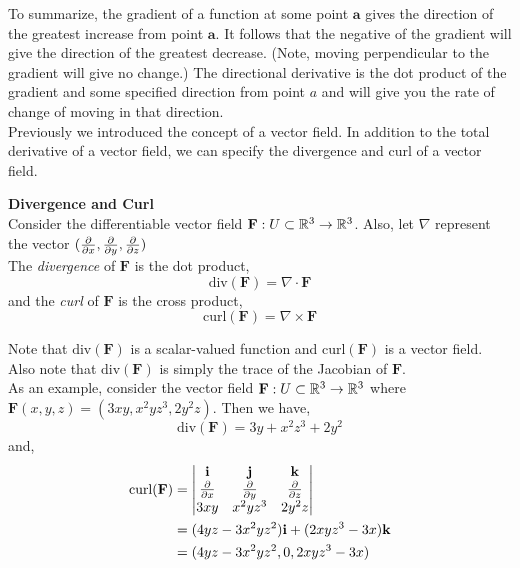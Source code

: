 \documentclass[12pt]{article}
\begin{document}
To summarize, the gradient of a function at some point $\mathbf{a}$ gives the direction of the greatest increase from point $\mathbf{a}$. It follows that the negative of the gradient will give the direction of the greatest decrease. (Note, moving perpendicular to the gradient will give no change.) The directional derivative is the dot product of the gradient and some specified direction from point $a$ and will give you the rate of change of moving in that direction. \\

Previously we introduced the concept of a vector field. In addition to the total derivative of a vector field, we can specify the divergence and curl of a vector field. \\

\begin{framed}
\textbf{Divergence and Curl} \\
Consider the differentiable vector field $\mathbf{F}:U\subset\mathbb{R}^3\rightarrow\mathbb{R}^3$. Also, let $\nabla$ represent the vector $(\frac{\partial }{\partial x},\frac{\partial }{\partial y},\frac{\partial }{\partial z})$ \\

 The \emph{divergence} of $\mathbf{F}$ is the dot product,
\[
\mbox{div}(\mathbf{F}) = \nabla\cdot\mathbf{F}
\]
and the \emph{curl} of $\mathbf{F}$ is the cross product,
\[
\mbox{curl}(\mathbf{F}) = \nabla\times\mathbf{F}
\]
\end{framed}

Note that $\mbox{div}(\mathbf{F})$ is a scalar-valued function and $\mbox{curl}(\mathbf{F})$ is a vector field. Also note that $\mbox{div}(\mathbf{F})$ is simply the trace of the Jacobian of $\mathbf{F}$. \\

As an example, consider the vector field $\mathbf{F}:U\subset\mathbb{R}^3\rightarrow\mathbb{R}^3$ where $\mathbf{F}(x,y,z)=(3xy, x^2yz^3, 2y^2z)$. Then we have,
\[
\mbox{div}({\mathbf{F}}) = 3y + x^2z^3 + 2y^2
\]
and,
\begin{align*}
\mbox{curl}(\mathbf{F}) &= 
\begin{vmatrix}
\mathbf{i} & \mathbf{j} & \mathbf{k} \\
\frac{\partial }{\partial x} & \frac{\partial }{\partial y} & \frac{\partial }{\partial z} \\
3xy & x^2yz^3 & 2y^2z 
\end{vmatrix} \\
&= (4yz - 3x^2yz^2)\mathbf{i} + (2xyz^3 - 3x)\mathbf{k} \\
&= (4yz - 3x^2yz^2, 0, 2xyz^3 - 3x)
\end{align*}
\end{document}
